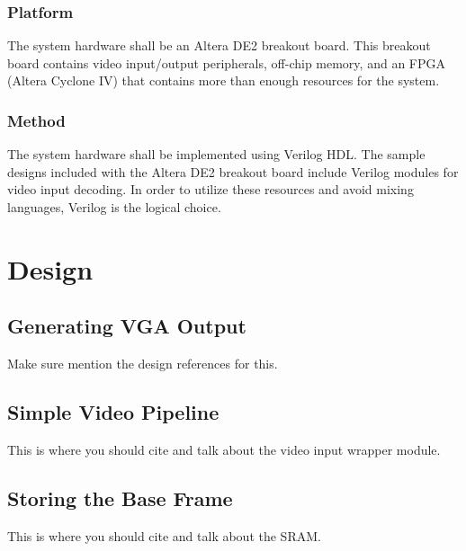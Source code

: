 \documentclass[11pt]{article} %
\begin{document}
\subsubsection{Platform}
The system hardware shall be an Altera DE2 breakout board. This breakout board contains video input/output peripherals, off-chip memory, and an FPGA (Altera Cyclone IV) that contains more than enough resources for the system.
\subsubsection{Method}
The system hardware shall be implemented using Verilog HDL. The sample designs included with the Altera DE2 breakout board include Verilog modules for video input decoding. In order to utilize these resources and avoid mixing languages, Verilog is the logical choice.
\section{Design}
\subsection{Generating VGA Output}
Make sure mention the design references for this.
\subsection{Simple Video Pipeline}
This is where you should cite \cite{13} and talk about the video input wrapper module.
\subsection{Storing the Base Frame}
This is where you should cite \cite{14} and talk about the SRAM.
\end{document}
